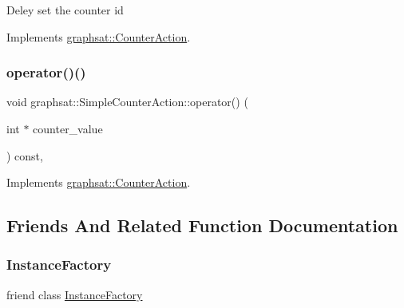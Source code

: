 Deley set the counter id 

Implements \mbox{\hyperlink{classgraphsat_1_1_counter_action_a09e8a5779f0ae70ea07e8974d93edf2e}{graphsat\+::\+Counter\+Action}}.

\mbox{\label{classgraphsat_1_1_simple_counter_action_abe1adcfe43f50662da5daddf59b94bb0}} 
\subsubsection{\texorpdfstring{operator()()}{operator()()}}
{\footnotesize\ttfamily void graphsat\+::\+Simple\+Counter\+Action\+::operator() (\begin{DoxyParamCaption}\item[{int $\ast$}]{counter\+\_\+value }\end{DoxyParamCaption}) const\hspace{0.3cm}{\ttfamily [inline]}, {\ttfamily [virtual]}}



Implements \mbox{\hyperlink{classgraphsat_1_1_counter_action_ac21660dc667a4abca69fdda313c6708c}{graphsat\+::\+Counter\+Action}}.



\subsection{Friends And Related Function Documentation}
\mbox{\label{classgraphsat_1_1_simple_counter_action_ad4b3c25c041701ae56dc1e78df779d2f}} 
\subsubsection{\texorpdfstring{InstanceFactory}{InstanceFactory}}
{\footnotesize\ttfamily friend class \mbox{\hyperlink{classgraphsat_1_1_instance_factory}{Instance\+Factory}}\hspace{0.3cm}{\ttfamily [friend]}}



